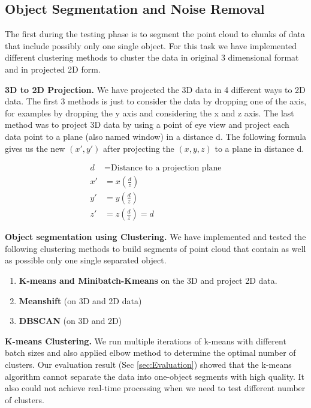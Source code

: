 


\subsection{Object Segmentation and Noise Removal}
The first during the testing phase is to segment the point cloud to chunks of data that include possibly only one single object.
For this task we have implemented different clustering methods to cluster the data in original 3 dimensional format and in projected 2D form.      



\textbf{3D to 2D Projection.} We have projected the 3D data in 4 different ways to 2D data. The first 3 methods is just to consider the data by dropping one of the axis, for examples by dropping the y axis and considering the x and z axis.  The last method was to project 3D data by using a point of eye view and project each data point to a plane (also named window) in a distance d.  The following formula gives us the new $(x',  y')$ after projecting the $(x,y,z)$ to a plane in distance d. 

\begin{align*}
d  & = \text{Distance to a projection plane} \\   
x' & =  x (\frac{d}{z}) \\  
y' & =  y (\frac{d}{z}) \\
z' & =  z (\frac{d}{z}) = d  
\end{align*}



\textbf{Object segmentation using Clustering.} We have implemented and tested the following clustering methods to build segments of point cloud that contain as well as possible only one single separated object.  

\begin{enumerate}
  \item \textbf{K-means and Minibatch-Kmeans} on the 3D and project 2D data.    
  \item \textbf{Meanshift} (on 3D and 2D data) 
  \item \textbf{DBSCAN}  (on 3D and 2D)
\end{enumerate}

\textbf{K-means Clustering.} We run multiple iterations of k-means with different batch sizes and also applied elbow method to determine the optimal number of clusters.
Our evaluation result (Sec \ref{sec:Evaluation}) showed that the k-means algorithm cannot separate the data into one-object segments with high quality. It also could not achieve real-time processing when we need to test different number of clusters. 

